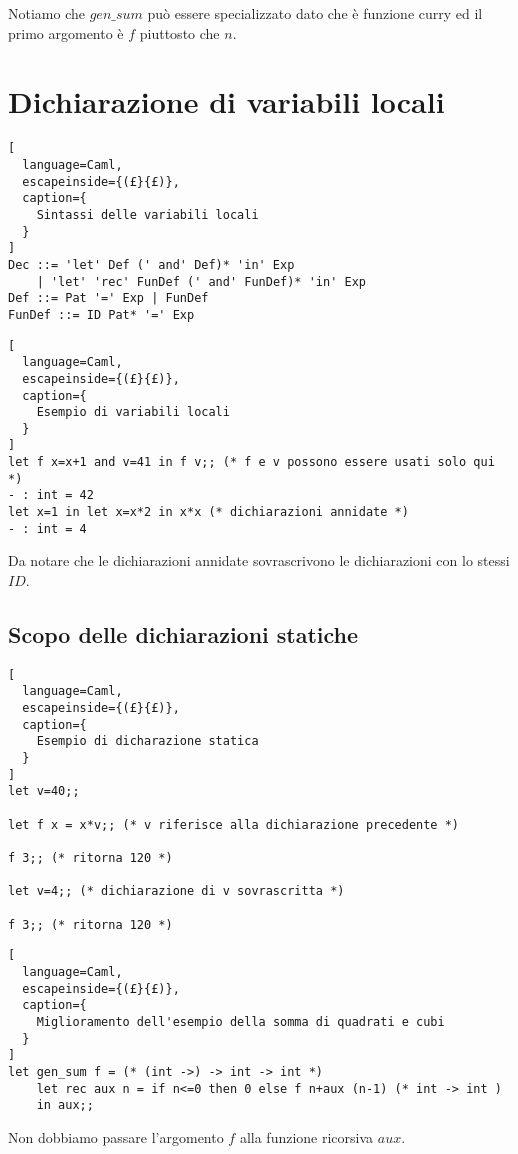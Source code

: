 Notiamo che $gen\_sum$ può essere specializzato dato che è funzione curry
ed il primo argomento è $f$ piuttosto che $n$.

\section{Dichiarazione di variabili locali}
\begin{lstlisting}[
  language=Caml,
  escapeinside={(£}{£)},
  caption={
    Sintassi delle variabili locali
  }
]
Dec ::= 'let' Def (' and' Def)* 'in' Exp
    | 'let' 'rec' FunDef (' and' FunDef)* 'in' Exp
Def ::= Pat '=' Exp | FunDef
FunDef ::= ID Pat* '=' Exp
\end{lstlisting}

\begin{lstlisting}[
  language=Caml,
  escapeinside={(£}{£)},
  caption={
    Esempio di variabili locali
  }
]
let f x=x+1 and v=41 in f v;; (* f e v possono essere usati solo qui *)
- : int = 42
let x=1 in let x=x*2 in x*x (* dichiarazioni annidate *)
- : int = 4
\end{lstlisting}

Da notare che le dichiarazioni annidate sovrascrivono le dichiarazioni con
lo stessi $ID$.

\subsection{Scopo delle dichiarazioni statiche}
\begin{lstlisting}[
  language=Caml,
  escapeinside={(£}{£)},
  caption={
    Esempio di dicharazione statica
  }
]
let v=40;;

let f x = x*v;; (* v riferisce alla dichiarazione precedente *)

f 3;; (* ritorna 120 *)

let v=4;; (* dichiarazione di v sovrascritta *)

f 3;; (* ritorna 120 *)
\end{lstlisting}

\begin{lstlisting}[
  language=Caml,
  escapeinside={(£}{£)},
  caption={
    Miglioramento dell'esempio della somma di quadrati e cubi
  }
]
let gen_sum f = (* (int ->) -> int -> int *)
    let rec aux n = if n<=0 then 0 else f n+aux (n-1) (* int -> int )
    in aux;;
\end{lstlisting}

Non dobbiamo passare l'argomento $f$ alla funzione ricorsiva $aux$.

